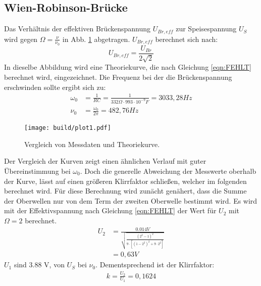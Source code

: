 \subsection{Wien-Robinson-Brücke}
\label{sec:Wien}
Das Verhältnis der effektiven Brückenspannung $U_{Br,eff}$ zur Speisespannung $U_S$ wird gegen $\Omega = \frac{\nu}{\nu_0}$ in Abb. \ref{fig:plot} abgetragen.
$U_{Br,eff}$ berechnet sich nach:
\begin{equation}
  U_{Br,eff} = \frac{U_{Br}}{2 \sqrt{2}}
\end{equation}
In dieselbe Abbildung wird eine Theoriekurve, die nach Gleichung \ref{eqn:FEHLT} berechnet wird, eingezeichnet.
Die Frequenz bei der die Brückenspannung erschwinden sollte ergibt sich zu:
\begin{align}
  \omega_0 &= \frac{1}{RC} = \frac{1}{332 \Omega \cdot 993 \cdot 10^{-9} F} = 3033,28 Hz \\
  \nu_0 &= \frac{\omega_0}{2 \pi} = 482,76 Hz
\end{align} 
\newpage
\begin{figure}
  \centering
  \texttt{[image: build/plot1.pdf]}
  \caption{Vergleich von Messdaten und Theoriekurve.}
  \label{fig:plot}
\end{figure}
Der Vergleich der Kurven zeigt einen ähnlichen Verlauf mit guter Übereinstimmung bei $\omega_0$.
Doch die generelle Abweichung der Messwerte oberhalb der Kurve, lässt auf einen größeren Klirrfaktor schließen, welcher im folgenden berechnet wird.
Für diese Berechnung wird zunächt genähert, dass die Summe der Oberwellen nur von dem Term der zweiten Oberwelle bestimmt wird.
Es wird mit der Effektivspannung nach Gleichung \ref{eqn:FEHLT} der Wert für $U_2$ mit $\Omega = 2$ berechnet.
\begin{align}
  U_2 &= \frac{0.014 V}{\sqrt{\frac{(2^2-1)^2}{9 \cdot [(1-2^2)^2+9 \cdot 2^2]}}} \\
  &= 0,63 V
\end{align}
$U_1$ sind 3.88 V, von $U_S$ bei $\nu_0$.
Dementsprechend ist der Klirrfaktor:
\begin{align}
  k = \frac{U_2}{U_1} = 0,1624
\end{align}

